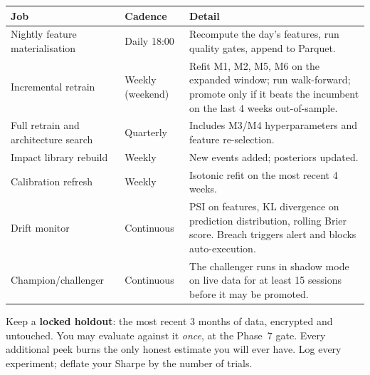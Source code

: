 \begin{longtable}{@{}p{3.6cm}p{3.2cm}p{7.6cm}@{}}
\toprule
\textbf{Job} & \textbf{Cadence} & \textbf{Detail}\\
\midrule
Nightly feature materialisation & Daily 18:00 & Recompute the day's features,
run quality gates, append to Parquet.\\
Incremental retrain & Weekly (weekend) & Refit M1, M2, M5, M6 on the expanded
window; run walk-forward; promote only if it beats the incumbent on the
last 4 weeks out-of-sample.\\
Full retrain and architecture search & Quarterly & Includes M3/M4
hyperparameters and feature re-selection.\\
Impact library rebuild & Weekly & New events added; posteriors updated.\\
Calibration refresh & Weekly & Isotonic refit on the most recent 4 weeks.\\
Drift monitor & Continuous & PSI on features, KL divergence on prediction
distribution, rolling Brier score. Breach triggers alert and blocks
auto-execution.\\
Champion/challenger & Continuous & The challenger runs in shadow mode on live
data for at least 15 sessions before it may be promoted.\\
\bottomrule
\end{longtable}

\begin{warnbox}[title={Anti-overfitting discipline}]
Keep a \textbf{locked holdout}: the most recent 3 months of data, encrypted and
untouched. You may evaluate against it \emph{once}, at the Phase~7 gate.
Every additional peek burns the only honest estimate you will ever have.
Log every experiment; deflate your Sharpe by the number of trials.
\end{warnbox}

